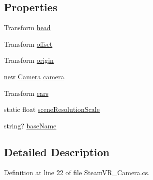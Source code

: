 \subsection*{Properties}
\begin{DoxyCompactItemize}
\item 
Transform \mbox{\hyperlink{class_valve_1_1_v_r_1_1_steam_v_r___camera_a29bcd51ea929477bfbca732afe76f4db}{head}}
\item 
Transform \mbox{\hyperlink{class_valve_1_1_v_r_1_1_steam_v_r___camera_aa7f6289ce231db679a28107fef38b0d9}{offset}}
\item 
Transform \mbox{\hyperlink{class_valve_1_1_v_r_1_1_steam_v_r___camera_a12fe684a54d4cade55c1ba7d693e38bd}{origin}}
\item 
new \mbox{\hyperlink{namespace_valve_1_1_v_r_a82e5bf501cc3aa155444ee3f0662853fa967d35e40f3f95b1f538bd248640bf3b}{Camera}} \mbox{\hyperlink{class_valve_1_1_v_r_1_1_steam_v_r___camera_ae118c58f9341a3cf4e24472a19131318}{camera}}
\item 
Transform \mbox{\hyperlink{class_valve_1_1_v_r_1_1_steam_v_r___camera_a3127cd98719685b513db0d5debbec31b}{ears}}
\item 
static float \mbox{\hyperlink{class_valve_1_1_v_r_1_1_steam_v_r___camera_a15bffee48af1ca15135cf48e33622e56}{scene\+Resolution\+Scale}}
\item 
string? \mbox{\hyperlink{class_valve_1_1_v_r_1_1_steam_v_r___camera_ac2f444cc76f6dedb835a4b14c9112925}{base\+Name}}
\end{DoxyCompactItemize}


\subsection{Detailed Description}


Definition at line 22 of file Steam\+V\+R\+\_\+\+Camera.\+cs.



